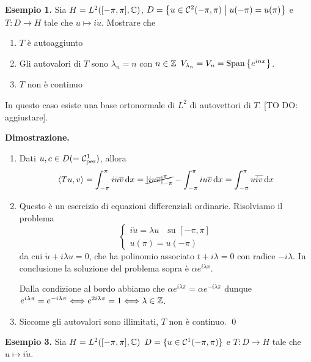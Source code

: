 \textbf{Esempio 1.} Sia $H = L^2([-\pi,\pi],\mathbb C)$, $D = \left\{ u \in \mathcal{C}^2 (-\pi,\pi) \;\middle|\; u(-\pi) = u(\pi) \right\}$ e $T \colon D \to H$ tale che $u \mapsto i\dot u$.
Mostrare che
\begin{enumerate}

	\item $T$ è autoaggiunto

	\item Gli autovalori di $T$ sono $\lambda_n = n$ con $n \in \mathbb Z$ $V_{\lambda_n} = V_n = \operatorname{Span} \left\{ e^{inx} \right\}$.

	\item $T$ non è continuo

\end{enumerate}


In questo caso esiste una base ortonormale di $L^2$ di autovettori di $T$. [TO DO: aggiustare].

\textbf{Dimostrazione.} 
\begin{enumerate}

	\item Dati $u,c \in D (= \mathcal{C}_{\operatorname{per}}^1)$, allora
	$$
		\left<Tu,v \right> = \int_{-\pi}^\pi i \dot u \overline{v} \,\mathrm{d} x
		= \cancel{\left| iu\overline{v} \right|_{-\pi}^\pi} - \int_{-\pi}^\pi iu \overline{v} \,\mathrm{d} x
		= \int_{-\pi}^\pi u \overline{iv} \,\mathrm{d} x
	$$

	\item Questo è un esercizio di equazioni differenziali ordinarie. Risolviamo il problema
	$$
	\begin{cases}
		i\dot u = \lambda u \quad \text{su } [-\pi,\pi] \\
		u(\pi) = u(-\pi)
	\end{cases} 
	$$
	da cui $\dot u + i \lambda u = 0$, che ha polinomio associato $t + i\lambda = 0$ con radice  $-i\lambda$. In conclusione la soluzione del problema sopra è $\alpha e^{i\lambda x}$.

	Dalla condizione al bordo abbiamo che $\alpha e^{i\lambda \pi} = \alpha e^{-i\lambda \pi}$ dunque $e^{i\lambda \pi} = e^{- i\lambda \pi} \Longleftrightarrow e^{2i\lambda \pi} = 1 \Longleftrightarrow \lambda \in \mathbb Z$.


	\item Siccome gli autovalori sono illimitati, $T$ non è continuo.
\qed

\end{enumerate}


\textbf{Esempio 3.} Sia $H = L^2([-\pi,\pi], \mathbb C)$ $D = \{ u \in \mathcal{C}^1(-\pi,\pi) \}$ e $T \colon D \to H$ tale che $u \mapsto i\dot u$.

